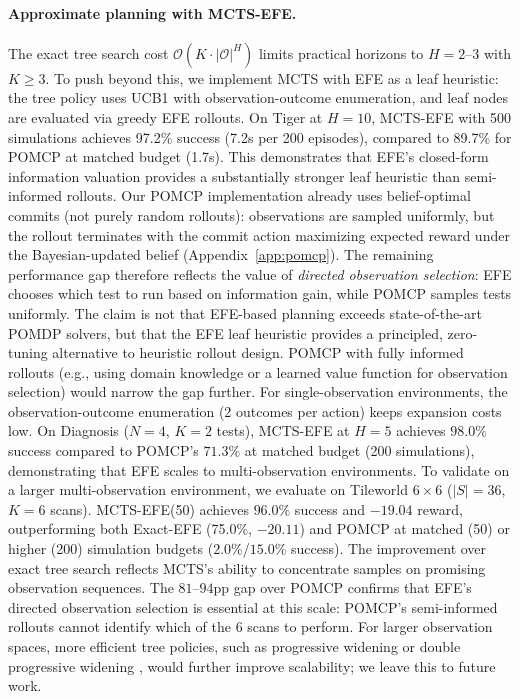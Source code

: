 \documentclass{article}
\begin{document}
\paragraph{Approximate planning with MCTS-EFE.}
The exact tree search cost $\mathcal{O}(K \cdot |\mathcal{O}|^H)$ limits practical horizons to $H{=}2$--$3$ with $K \geq 3$. To push beyond this, we implement MCTS with EFE as a leaf heuristic: the tree policy uses UCB1 with observation-outcome enumeration, and leaf nodes are evaluated via greedy EFE rollouts. On Tiger at $H{=}10$, MCTS-EFE with 500 simulations achieves 97.2\% success (7.2s per 200 episodes), compared to 89.7\% for POMCP at matched budget (1.7s). This demonstrates that EFE's closed-form information valuation provides a substantially stronger leaf heuristic than semi-informed rollouts. Our POMCP implementation already uses belief-optimal commits (not purely random rollouts): observations are sampled uniformly, but the rollout terminates with the commit action maximizing expected reward under the Bayesian-updated belief (Appendix~\ref{app:pomcp}). The remaining performance gap therefore reflects the value of \emph{directed observation selection}: EFE chooses which test to run based on information gain, while POMCP samples tests uniformly. The claim is not that EFE-based planning exceeds state-of-the-art POMDP solvers, but that the EFE leaf heuristic provides a principled, zero-tuning alternative to heuristic rollout design. POMCP with fully informed rollouts (e.g., using domain knowledge or a learned value function for observation selection) would narrow the gap further. For single-observation environments, the observation-outcome enumeration (2 outcomes per action) keeps expansion costs low. On Diagnosis ($N{=}4$, $K{=}2$ tests), MCTS-EFE at $H{=}5$ achieves $98.0\%$ success compared to POMCP's $71.3\%$ at matched budget (200 simulations), demonstrating that EFE scales to multi-observation environments. To validate on a larger multi-observation environment, we evaluate on Tileworld $6{\times}6$ ($|S|{=}36$, $K{=}6$ scans). MCTS-EFE(50) achieves $96.0\%$ success and $-19.04$ reward, outperforming both Exact-EFE (75.0\%, $-20.11$) and POMCP at matched (50) or higher (200) simulation budgets ($2.0\%$/$15.0\%$ success). The improvement over exact tree search reflects MCTS's ability to concentrate samples on promising observation sequences. The $81$--$94$pp gap over POMCP confirms that EFE's directed observation selection is essential at this scale: POMCP's semi-informed rollouts cannot identify which of the 6 scans to perform. For larger observation spaces, more efficient tree policies, such as progressive widening or double progressive widening \citep{benchetrit2025}, would further improve scalability; we leave this to future work.
\end{document}
